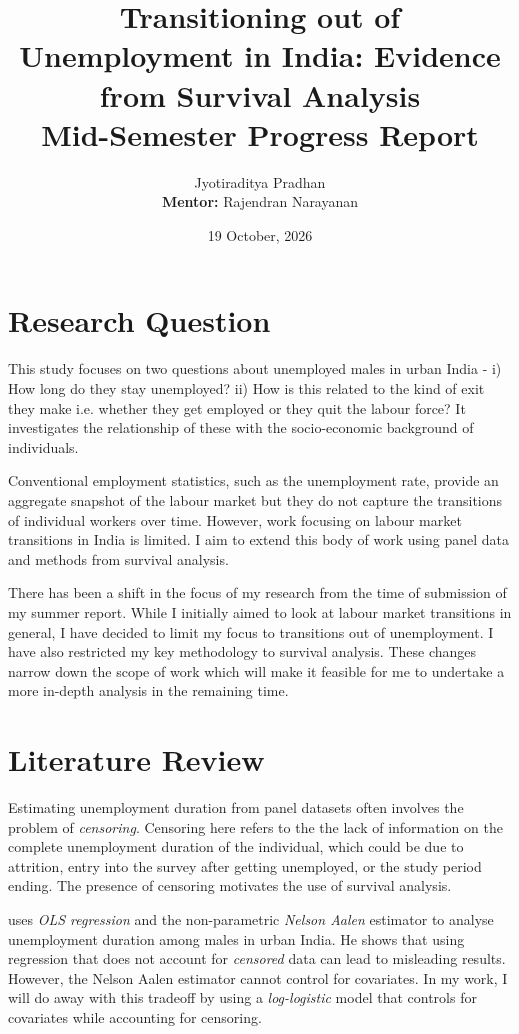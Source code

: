 \documentclass{article}
\title{Transitioning out of Unemployment in India: Evidence from Survival Analysis \\ [1 em] \Large Mid-Semester Progress Report}
\author{
Jyotiraditya Pradhan \\ 
\textbf{Mentor:} Rajendran Narayanan
}
\date{19 October, 2026}
\begin{document}
\maketitle

\section{Research Question}

This study focuses on two questions about unemployed males in urban India - i) How long do they stay unemployed? ii) How is this related to the kind of exit they make i.e. whether they get employed or they quit the labour force? It investigates the relationship of these with the socio-economic background of individuals.

Conventional employment statistics, such as the unemployment rate, provide an aggregate snapshot of the labour market but they do not capture the transitions of individual workers over time. However, work focusing on labour market transitions in India is limited. I aim to extend this body of work using panel data and methods from survival analysis.

There has been a shift in the focus of my research from the time of submission of my summer report. While I initially aimed to look at labour market transitions in general, I have decided to limit my focus to transitions out of unemployment. I have also restricted my key methodology to survival analysis. These changes narrow down the scope of work which will make it feasible for me to undertake a more in-depth analysis in the remaining time. 

\section{Literature Review}

Estimating unemployment duration from panel datasets often involves the problem of \textit{censoring}. Censoring here refers to the the lack of information on the complete unemployment duration of the individual, which could be due to attrition, entry into the survey after getting unemployed, or the study period ending. The presence of censoring motivates the use of survival analysis.

\textcite{kannan_2025} uses \textit{OLS regression} and the non-parametric \textit{Nelson Aalen} estimator to analyse unemployment duration among males in urban India. He shows that using regression that does not account for \textit{censored} data can lead to misleading results. However, the Nelson Aalen estimator cannot control for covariates. In my work, I will do away with this tradeoff by using a \textit{log-logistic} model that controls for covariates while accounting for censoring.
\end{document}
